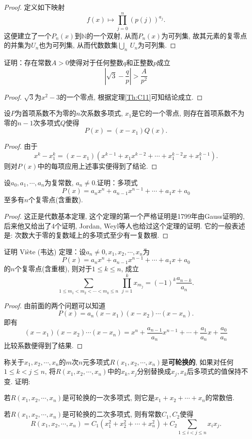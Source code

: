 \begin{quiza}
\begin{proof}
定义如下映射\[f(x)\mapsto\prod_{j=0}^{n}\left(p(j)\right)^{a_j}.\]
这便建立了一个\(P_n(x)\)到\(\mathbb{N}\)的一个双射, 从而\(P_n(x)\)为可列集, 故其元素的复零点的并集为\(U_n\)也为可列集, 从而代数数集\(\underset{n}{\bigcup}\,U_n\)为可列集.
\end{proof}
\woe 证明：存在常数\(A>0\)使得对于任何整数\(q\)和正整数\(p\)成立\[\left|\sqrt{3}-\frac{q}{p}\right|>\frac{A}{p^2}\]
\begin{proof}
\(\sqrt{3}\)为\(x^2-3\)的一个零点, 根据定理\ref{Th:C11}可知结论成立.
\end{proof}
\end{quiza}
\begin{quizb}
\woe 设\(P\)为首项系数不为零的\(n\)次系数多项式, \(x_1\)是它的一个零点, 则存在首项系数不为零的\(n-1\)次多项式\(Q\)使得\[P(x)=(x-x_1)Q(x).\]
\begin{proof}
由于\[x^k-x_1^k=(x-x_1)\left(x^{k-1}+x_1x^{k-2}+\cdots+x_1^{k-2}x+x_1^{k-1}\right).\]则对\(P(x)\)中的每项应用上述事实便得到了结论.
\end{proof}
\woe 设\(a_0,a_1,\cdots,a_n\)为复常数, \(a_n\ne 0\).证明：多项式\[P(x)=a_nx^n+a_{n-1}x^{n-1}+\cdots+a_1x+a_0\]至多有\(n\)个复零点(含重数).
\begin{proof}
这正是代数基本定理, 这个定理的第一个严格证明是1799年由Gauss证明的, 后来他又给出了4个证明, Jordan, Weyl等人也给过这个定理的证明. 它的一般表述是: 次数大于零的复数域上的多项式至少有一复数根.
\end{proof}
\woe 证明 Vi\`{e}te (韦达) 定理：设\(a_n\ne 0,x_1,x_2,\cdots,x_n\)为\[P(x)=a_nx^n+a_{n-1}x^{n-1}+\cdots+a_1x+a_0\]的\(n\)个复零点(含重根), 则对于\(1\leqslant k\leqslant n\), 成立 \[\sum_{1\leqslant m_1<m_2<\cdots<m_k\leqslant n}\,\prod_{j=1}^{k}x_{m_j}=(-1)^k \frac{a_{n-k}}{a_n}.\]
\begin{proof}
由前面的两个问题可以知道\[P(x)=a_n(x-x_1)(x-x_2)\cdots(x-x_n).\]即有\[(x-x_1)(x-x_2)\cdots(x-x_n)=x^n+\frac{a_{n-1}}{a_n}x^{n-1}+\cdots+\frac{a_1}{a_n}x+\frac{a_0}{a_n}\]比较系数便得到了结果.
\end{proof}
\woe 称关于\(x_1,x_2,\cdots,x_n\)的\(m\)次\(n\)元多项式\(R(x_1,x_2,\cdots,x_n)\)是\textbf{可轮换的}, 如果对任何\(1\leqslant k<j\leqslant n\), 将\(R(x_1,x_2,\cdots,x_n)\)中的\(x_k,x_j\)分别替换成\(x_j,x_k\)后多项式的值保持不变. 证明: 
\begin{quizs}
\item 若\(R(x_1,x_2,\cdots,x_n)\)是可轮换的一次多项式, 则它是\(x_1+x_2+\cdots+x_n\)的常数倍.
\item 若\(R(x_1,x_2,\cdots,x_n)\)是可轮换的二次多项式, 则有常数\(C_1,C_2\)使得\[R(x_1,x_2,\cdots,x_n)=C_1(x_1^2+x_2^2+\cdots+x_n^2)+C_2\sum_{1\leqslant i<j\leqslant n }x_ix_j.\]

\end{quizs}
\end{quizb}
